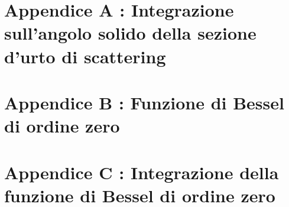 \documentclass{tufte-book} %
\theoremstyle{definition}
\theoremstyle{theorem}
\theoremstyle{plain}
\theoremstyle{remark}
\theoremstyle{remark}
\begin{document}
        
\appendix
\chapter{Appendice A : Integrazione sull'angolo solido della sezione d'urto di scattering}
\label{ch:integrazione-sezione-urto-angolo-solido}
 

\chapter{Appendice B : Funzione di Bessel di ordine zero}
\label{ch:funzione-bessel-zero}


\chapter{Appendice C : Integrazione della funzione di Bessel di ordine zero}
\label{ch:integrazione-bessel-zero}



\mainmatter


\backmatter




%
\end{document}
